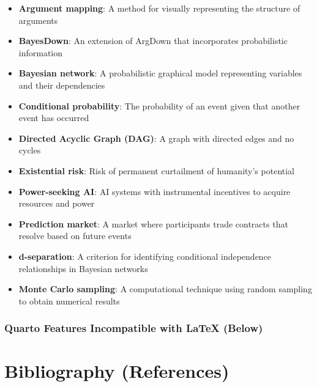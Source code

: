 \documentclass[
  letterpaper,
]{book}
\providecommand{\tightlist}{%
  \setlength{\itemsep}{0pt}\setlength{\parskip}{0pt}}
\begin{document}
\begin{itemize}
\tightlist
\item
  \textbf{Argument mapping}: A method for visually representing the
  structure of arguments\\
\item
  \textbf{BayesDown}: An extension of ArgDown that incorporates
  probabilistic information\\
\item
  \textbf{Bayesian network}: A probabilistic graphical model
  representing variables and their dependencies\\
\item
  \textbf{Conditional probability}: The probability of an event given
  that another event has occurred\\
\item
  \textbf{Directed Acyclic Graph (DAG)}: A graph with directed edges and
  no cycles\\
\item
  \textbf{Existential risk}: Risk of permanent curtailment of humanity's
  potential\\
\item
  \textbf{Power-seeking AI}: AI systems with instrumental incentives to
  acquire resources and power\\
\item
  \textbf{Prediction market}: A market where participants trade
  contracts that resolve based on future events\\
\item
  \textbf{d-separation}: A criterion for identifying conditional
  independence relationships in Bayesian networks\\
\item
  \textbf{Monte Carlo sampling}: A computational technique using random
  sampling to obtain numerical results
\end{itemize}

\subsection*{Quarto Features Incompatible with LaTeX
(Below)}\label{quarto-features-incompatible-with-latex-below}


\chapter*{Bibliography (References)}\label{bibliography-references}
\end{document}
